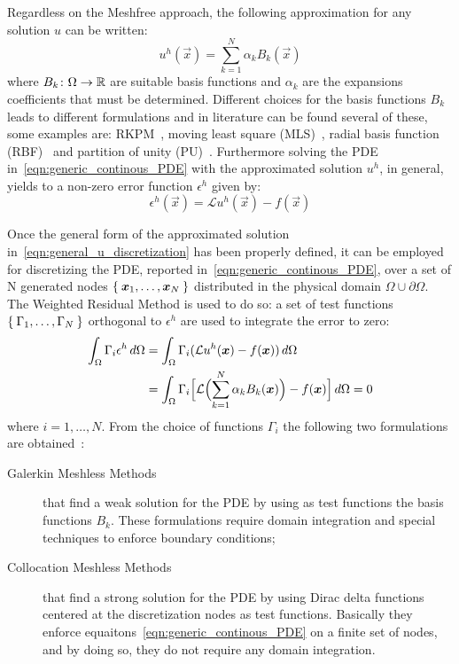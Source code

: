 Regardless on the Meshfree approach, the following approximation for any solution $u$ can be written:
\begin{equation}
	\label{eqn:general_u_discretization}
	u^{h}(\vec{x}) = \sum_{k= 1}^{N} {\alpha_k B_k(\vec{x})}
\end{equation}
where $B_k\colon\Omega\to\mathbb{R}$ are suitable basis functions and $\alpha_k$ are the expansions coefficients that must be determined.
Different choices for the basis functions $B_k$ leads to different formulations and in literature can be found several of these, some examples are: RKPM~\cite{Liu:RKPM}, moving least square (MLS)~\cite{Lancaster:MLS}, radial basis function (RBF)~\cite{Kansa:RBF_1, Kansa:RBF_2} and partition of unity (PU)~\cite{Schweitzer:PU}. Furthermore solving the PDE in~\eqref{eqn:generic_continous_PDE} with the approximated solution $u^h$, in general, yields to a non-zero error function $\epsilon^{h}$ given by:
\begin{equation}
	\epsilon^{h}(\vec{x}) = \mathcal{L} u^{h}(\vec{x}) - f(\vec{x})
\end{equation}

Once the general form of the approximated solution in~\eqref{eqn:general_u_discretization} has been properly defined, it can be employed for discretizing the PDE, reported in~\eqref{eqn:generic_continous_PDE}, over a set of N generated nodes $\Set{\boldsymbol{x}_1, \dots, \boldsymbol{x}_N}$ distributed in the physical domain $\Omega \cup \partial\Omega$.
The Weighted Residual Method is used to do so: a set of test functions $\Set{\Gamma_1, \dots, \Gamma_N}$ orthogonal to $\epsilon^{h}$ are used to integrate the error to zero:
\begin{equation}
\label{eqn:constraints_to_integrate_MMs_errors_to_zero}
	\begin{split}
		\int_{\Omega} \Gamma_i \epsilon^{h}\,d\Omega & = \int_{\Omega} \Gamma_i (\mathcal{L} u^{h}(\vec{x}) - f(\vec{x}))\,d\Omega  \\
		& = \int_{\Omega} \Gamma_i \Bigl[ \mathcal{L}\Bigl( \sum_{k= 1}^{N} {\alpha_k B_k(\vec{x})}\Bigr) - f(\vec{x})\Bigr]\,d\Omega = 0
	\end{split}
\end{equation}
where $i=1, \dots, N$. From the choice of functions $\Gamma_i$ the following two formulations are obtained~\cite{Chen:meshless_overview_after_20_years}:
\begin{description}
	\item[Galerkin Meshless Methods] that find a weak solution for the PDE by using as test functions the basis functions $B_k$. These formulations require domain integration and special techniques to enforce boundary conditions;
	\item[Collocation Meshless Methods] that find a strong solution for the PDE by using Dirac delta functions centered at the discretization nodes as test functions. Basically they enforce equaitons~\eqref{eqn:generic_continous_PDE} on a finite set of nodes, and by doing so, they do not require any domain integration.
\end{description}

